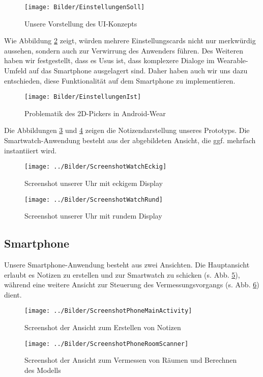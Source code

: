 \begin{figure}[H]
	\centering
	\texttt{[image: Bilder/EinstellungenSoll]}
	\caption{Unsere Vorstellung des UI-Konzepts}
	\label{fig:EinstellungenSoll}
\end{figure}

Wie Abbildung \ref{fig:EinstellungenIst} zeigt, würden mehrere Einstellungscards nicht nur merkwürdig aussehen, sondern auch zur Verwirrung des Anwenders führen. Des Weiteren haben wir festgestellt, dass es Usus ist, dass komplexere Dialoge im Wearable-Umfeld auf das Smartphone ausgelagert sind. Daher haben auch wir uns dazu entschieden, diese Funktionalität auf dem Smartphone zu implementieren.

\begin{figure}[H]
\centering
\texttt{[image: Bilder/EinstellungenIst]}
\caption{Problematik des 2D-Pickers in Android-Wear}
\label{fig:EinstellungenIst}
\end{figure}

Die Abbildungen \ref{fig:ScreenshotWatchEckig} und \ref{fig:ScreenshotWatchRund} zeigen
die Notizendarstellung unseres Prototyps. Die Smartwatch-Anwendung besteht aus der abgebildeten Ansicht, die ggf. mehrfach instantiiert wird.

\begin{figure}[H]
\centering
\texttt{[image: ../Bilder/ScreenshotWatchEckig]}
\caption{Screenshot unserer Uhr mit eckigem Display}
\label{fig:ScreenshotWatchEckig}
\end{figure}

\begin{figure}[H]
\centering
\texttt{[image: ../Bilder/ScreenshotWatchRund]}
\caption{Screenshot unserer Uhr mit rundem Display}
\label{fig:ScreenshotWatchRund}
\end{figure}

\subsection{Smartphone}
Unsere Smartphone-Anwendung besteht aus zwei Ansichten. Die Hauptansicht erlaubt es Notizen zu erstellen und zur Smartwatch zu schicken (s. Abb. \ref{fig:ScreenshotPhoneMainActivity}), während eine weitere Ansicht zur Steuerung des Vermessungsvorgangs (s. Abb. \ref{fig:ScreenshotPhoneRoomScanner}) dient.
 
\begin{figure}[H]
\centering
\texttt{[image: ../Bilder/ScreenshotPhoneMainActivity]}
\caption{Screenshot der Ansicht zum Erstellen von Notizen}
\label{fig:ScreenshotPhoneMainActivity}
\end{figure}

\begin{figure}[H]
\centering
\texttt{[image: ../Bilder/ScreenshotPhoneRoomScanner]}
\caption{Screenshot der Ansicht zum Vermessen von Räumen und Berechnen des Modells}
\label{fig:ScreenshotPhoneRoomScanner}
\end{figure}

